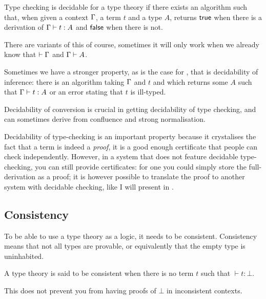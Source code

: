 \begin{definition}
  Type checking is decidable for a type theory if there exists an algorithm
  such that, when given a context \(\Gamma\), a term \(t\) and a type \(A\),
  returns \(\mathsf{true}\) when there is a derivation of \(\Gamma \vdash t : A\)
  and \(\mathsf{false}\) when there is not.
\end{definition}

There are variants of this of course, sometimes it will only work when we
already know that \(\vdash \Gamma\) and \(\Gamma \vdash A\).

Sometimes we have a stronger property, as is the case for \Coq, that is
decidability of inference:
there is an algorithm taking \(\Gamma\) and \(t\) and which returns some \(A\)
such that \(\Gamma \vdash t : A\) or an error stating that \(t\) is ill-typed.

Decidability of conversion is crucial in getting decidability of type
checking, and can sometimes derive from confluence and strong normalisation.

Decidability of type-checking is an important property because it crystalises
the fact that a term is indeed a \emph{proof}, it is a good enough certificate
that people can check independently.
However, in a system that does not feature decidable type-checking, you can still
provide certificates: for one you could simply store the full-derivation as a
proof; it is however possible to translate the proof to another system with
decidable checking, like I will present in .

\subsection{Consistency}

To be able to use a type theory as a logic, it needs to be consistent.
Consistency means that not all types are provable, or equivalently that
the empty type is uninhabited.

\begin{definition}[Consistency]
  A type theory is said to be consistent when there is no term \(t\) such that
  \(\vdash t : \bot\).
\end{definition}

This does not prevent you from having proofs of \(\bot\) in inconsistent
contexts.

